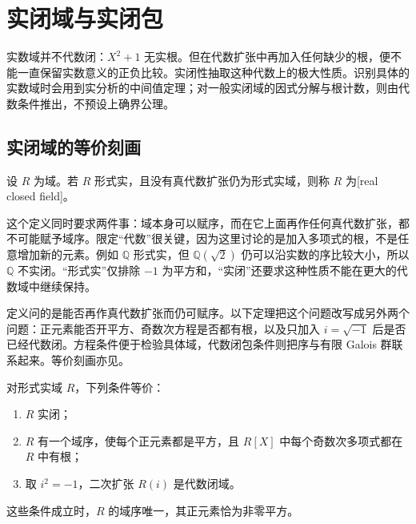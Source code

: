 
\section{实闭域与实闭包}
\label{b1:sec:E02}

实数域并不代数闭：\(X^2+1\) 无实根。但在代数扩张中再加入任何缺少的根，便不能一直保留实数意义的正负比较。实闭性抽取这种代数上的极大性质。识别具体的实数域时会用到实分析的中间值定理；对一般实闭域的因式分解与根计数，则由代数条件推出，不预设上确界公理。

%
%

\subsection{实闭域的等价刻画}
\label{b1:subsec:E02:01}

\begin{definition}\label{b1:def:real-closed-field}
	设 \(R\) 为域。若 \(R\) 形式实，且没有真代数扩张仍为形式实域，则称 \(R\) 为[real closed field]。
\end{definition}

这个定义同时要求两件事：域本身可以赋序，而在它上面再作任何真代数扩张，都不可能赋予域序。限定“代数”很关键，因为这里讨论的是加入多项式的根，不是任意增加新的元素。例如 \(\mathbb Q\) 形式实，但 \(\mathbb Q(\sqrt2)\) 仍可以沿实数的序比较大小，所以 \(\mathbb Q\) 不实闭。“形式实”仅排除 \(-1\) 为平方和，“实闭”还要求这种性质不能在更大的代数域中继续保持。

\ProseParagraphBreak
定义问的是能否再作真代数扩张而仍可赋序。以下定理把这个问题改写成另外两个问题：正元素能否开平方、奇数次方程是否都有根，以及只加入 \(i=\sqrt{-1}\) 后是否已经代数闭。方程条件便于检验具体域，代数闭包条件则把序与有限 Galois 群联系起来。等价刻画亦见\cite[Theorem A.5.19]{Mangolte2020RealAlgebraicVarieties}。
\begin{theorem}[实闭域的等价刻画]\label{b1:thm:real-closed-characterizations}
	对形式实域 \(R\)，下列条件等价：
	\begin{enumerate}
		\item \(R\) 实闭；
		\item \(R\) 有一个域序，使每个正元素都是平方，且 \(R[X]\) 中每个奇数次多项式都在 \(R\) 中有根；
		\item 取 \(i^2=-1\)，二次扩张 \(R(i)\) 是代数闭域。
	\end{enumerate}

	这些条件成立时，\(R\) 的域序唯一，其正元素恰为非零平方。
\end{theorem}

